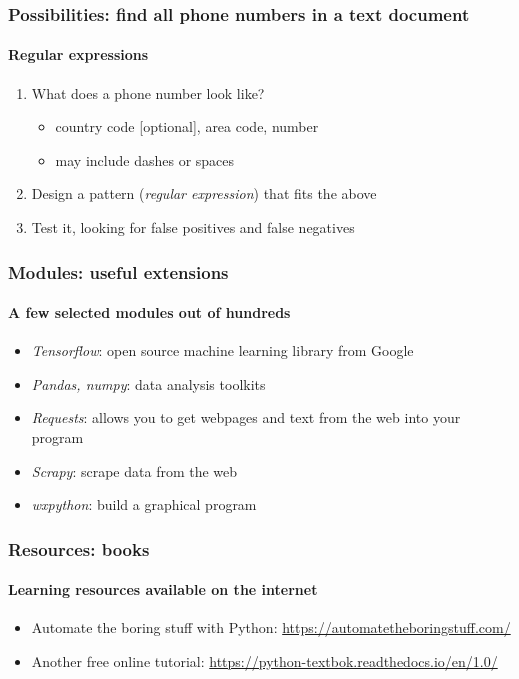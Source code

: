 \documentclass{beamer}
\begin{document}
    \begin{frame}
	    \frametitle{Possibilities: find all phone numbers in a text document}
	    \framesubtitle{Regular expressions}
	    \begin{enumerate}
		    \item What does a phone number look like?  
			    \begin{itemize}
				    \item country code [optional], area code, number
				    \item may include dashes or spaces
			    \end{itemize}
		    \item Design a pattern (\textit{regular expression}) that fits the above
		    \item Test it, looking for false positives and false negatives
	    \end{enumerate}
    \end{frame}


    \begin{frame}
	    \frametitle{Modules: useful extensions}
	    \framesubtitle{A few selected modules out of hundreds}
	    \begin{itemize}
		    \item \textit{Tensorflow}: open source machine learning library from Google
		    \item \textit{Pandas, numpy}: data analysis toolkits
		    \item \textit{Requests}: allows you to get webpages and text from the web into your program
		    \item \textit{Scrapy}: scrape data from the web
		    \item \textit{wxpython}: build a graphical program
	    \end{itemize}
    \end{frame}



    \begin{frame}
	    \frametitle{Resources: books}
	    \framesubtitle{Learning resources available on the internet}
	    \begin{itemize}
		    \item Automate the boring stuff with Python: \url{https://automatetheboringstuff.com/}
		    \item Another free online tutorial: \url{https://python-textbok.readthedocs.io/en/1.0/}
	    \end{itemize}
    \end{frame}
\end{document}

